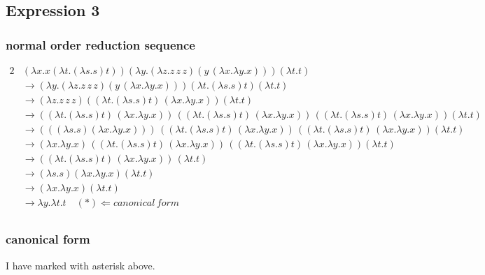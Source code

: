 \documentclass[a4papers]{ctexart}
\begin{document}
\subsection{Expression 3}
\subsubsection{normal order reduction sequence}
\begin{alignat*}{2}
    & (\lambda x.x(\lambda t.(\lambda s.s)t) )(\lambda y.(\lambda z.z\, z\, z)(y\,(\lambda x.\lambda y.x)) )(\lambda t.t)\\
    &\rightarrow (\lambda y.(\lambda z.z\, z\, z)(y\,(\lambda x.\lambda y.x)) )(\lambda t.(\lambda s.s)t) (\lambda t.t)\\
    &\rightarrow (\lambda z.z\, z\, z)( (\lambda t.(\lambda s.s)t)\,(\lambda x.\lambda y.x)) (\lambda t.t)\\
    &\rightarrow ( (\lambda t.(\lambda s.s)t)\,(\lambda x.\lambda y.x))\, ( (\lambda t.(\lambda s.s)t)\,(\lambda x.\lambda y.x))\, ( (\lambda t.(\lambda s.s)t)\,(\lambda x.\lambda y.x)) (\lambda t.t)\\
    &\rightarrow ( ((\lambda s.s)(\lambda x.\lambda y.x)))\, ( (\lambda t.(\lambda s.s)t)\,(\lambda x.\lambda y.x))\, ( (\lambda t.(\lambda s.s)t)\,(\lambda x.\lambda y.x)) (\lambda t.t)\\
    &\rightarrow (\lambda x.\lambda y.x)\, ( (\lambda t.(\lambda s.s)t)\,(\lambda x.\lambda y.x))\, ( (\lambda t.(\lambda s.s)t)\,(\lambda x.\lambda y.x)) (\lambda t.t)\\
    &\rightarrow ( (\lambda t.(\lambda s.s)t)\,(\lambda x.\lambda y.x))\,  (\lambda t.t)\\
    &\rightarrow  (\lambda s.s)(\lambda x.\lambda y.x)  (\lambda t.t)\\
    &\rightarrow  (\lambda x.\lambda y.x)  (\lambda t.t)\\
    &\rightarrow  \lambda y.\lambda t.t   \quad (*) \Leftarrow canonical\, form \\
\end{alignat*}

\subsubsection{canonical form}
I have marked with asterisk above. 
\end{document}
